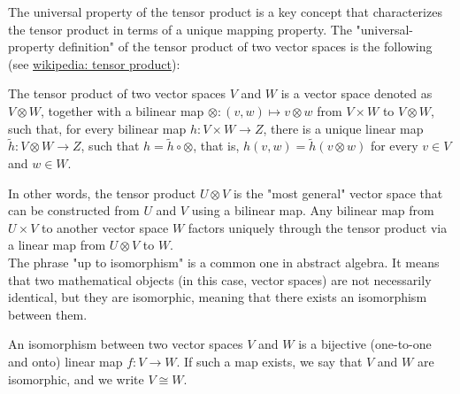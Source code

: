 The universal property of the tensor product is a key concept that
characterizes the tensor product in terms of a unique mapping property.
The "universal-property definition" of the tensor product of two vector spaces is the following
(see \href{https://en.wikipedia.org/wiki/Tensor_product#Universal_property}{wikipedia: tensor product}):

The tensor product of two vector spaces $V$ and $W$ is a vector space denoted as
$V\otimes W$, together with a bilinear map $\otimes : (v,w) \mapsto v\otimes w$
from $V\times W$ to $V\otimes W$, such that, for every bilinear map
$h : V\times W\to Z$, there is a unique linear map $\tilde{h} :V\otimes W\to Z$,
such that $h= \tilde{h} \circ \otimes$,
that is, $h(v,w) = \tilde{h} (v\otimes w)$ for every $v\in V$ and $w\in W$.


In other words, the tensor product $U \otimes V$ is the "most general" vector space that can be constructed
from $U$ and $V$ using a bilinear map.
Any bilinear map from $U \times V$ to another vector space $W$ factors uniquely through the tensor product
via a linear map from $U \otimes V$ to $W$.
\\

The phrase "up to isomorphism" is a common one in abstract algebra.
It means that two mathematical objects (in this case, vector spaces) are not necessarily identical,
but they are isomorphic, meaning that there exists an isomorphism between them.

An isomorphism between two vector spaces $V$ and $W$ is a bijective (one-to-one and onto)
linear map $f: V \to W$.
If such a map exists, we say that $V$ and $W$ are isomorphic, and we write $V \cong W$.